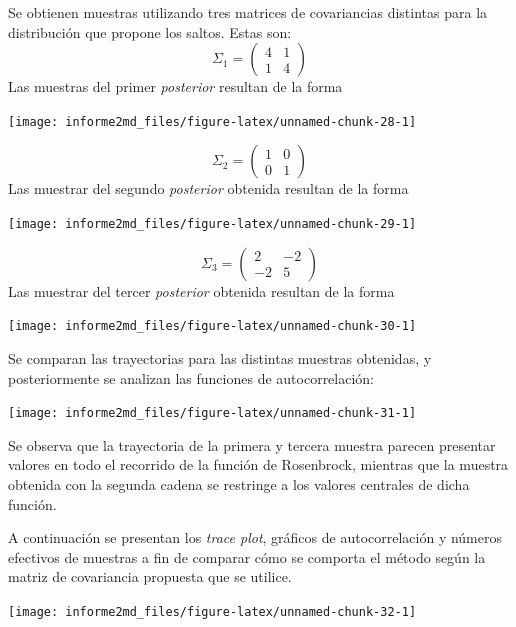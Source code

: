 \documentclass[
]{article}
\begin{document}
Se obtienen muestras utilizando tres matrices de covariancias distintas
para la distribución que propone los saltos. Estas son:
\[\Sigma_1=\begin{pmatrix}
   4 & 1 \\
   1 & 4
\end{pmatrix} \] Las muestras del primer \emph{posterior} resultan de la
forma

\begin{center}\texttt{[image: informe2md\_files/figure-latex/unnamed-chunk-28-1]} \end{center}

\[\Sigma_2=\begin{pmatrix}
   1 & 0 \\
   0 & 1
\end{pmatrix} \] Las muestrar del segundo \emph{posterior} obtenida
resultan de la forma

\begin{center}\texttt{[image: informe2md\_files/figure-latex/unnamed-chunk-29-1]} \end{center}

\[\Sigma_3=\begin{pmatrix}
   2 & -2 \\
   -2 & 5
\end{pmatrix} \] Las muestrar del tercer \emph{posterior} obtenida
resultan de la forma

\begin{center}\texttt{[image: informe2md\_files/figure-latex/unnamed-chunk-30-1]} \end{center}

Se comparan las trayectorias para las distintas muestras obtenidas, y
posteriormente se analizan las funciones de autocorrelación:

\begin{center}\texttt{[image: informe2md\_files/figure-latex/unnamed-chunk-31-1]} \end{center}

Se observa que la trayectoria de la primera y tercera muestra parecen
presentar valores en todo el recorrido de la función de Rosenbrock,
mientras que la muestra obtenida con la segunda cadena se restringe a
los valores centrales de dicha función.

A continuación se presentan los \emph{trace plot}, gráficos de
autocorrelación y números efectivos de muestras a fin de comparar cómo
se comporta el método según la matriz de covariancia propuesta que se
utilice.

\begin{center}\texttt{[image: informe2md\_files/figure-latex/unnamed-chunk-32-1]} \end{center}
\end{document}
